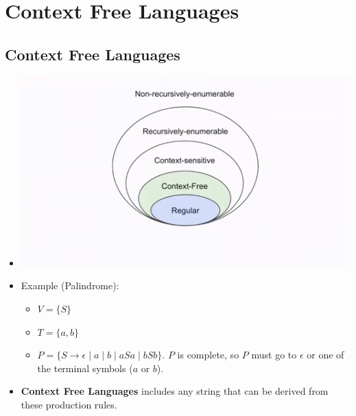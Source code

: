 
\section{Context Free Languages}

\subsection{Context Free Languages}
\begin{itemize}
    \item[] \includegraphics[width=\textwidth]{lecture8/images/chomsky-hierarchy-context-free.png}
    \item Example (Palindrome):
    \begin{itemize}
        \item $V = \{ S \}$
        \item $T = \{ a, b \}$
        \item $P = \{ S \rightarrow \epsilon \mid a \mid b \mid aSa \mid bSb \}$. $P$ is complete, so $P$ must go to $\epsilon$ or one of the terminal symbols ($a$ or $b$).
    \end{itemize}
    \item \textbf{Context Free Languages} includes any string that can be derived from these production rules.
\end{itemize}

